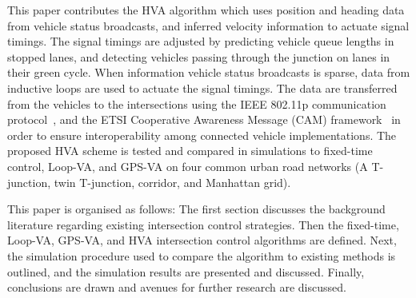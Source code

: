 \documentclass[numbered]{trbunofficial}
\begin{document}
This paper contributes the HVA algorithm which uses position and heading data from vehicle status broadcasts, and inferred velocity information to actuate signal timings. The signal timings are adjusted by predicting vehicle queue lengths in stopped lanes, and detecting vehicles passing through the junction on lanes in their green cycle. When information vehicle status broadcasts is sparse, data from inductive loops are used to actuate the signal timings. The data are transferred from the vehicles to the intersections using the IEEE 802.11p communication protocol~\cite{ieee80211p}, and the ETSI Cooperative Awareness Message (CAM) framework~\cite{EtsiCAM2011} in order to ensure interoperability among connected vehicle implementations. The proposed HVA scheme is tested and compared in simulations to fixed-time control, Loop-VA, and GPS-VA on four common urban road networks (A T-junction, twin T-junction, corridor, and Manhattan grid). %

This paper is organised as follows: The first section discusses the background literature regarding existing intersection control strategies. Then the fixed-time, Loop-VA, GPS-VA, and HVA intersection control algorithms are defined. Next, the simulation procedure used to compare the algorithm to existing methods is outlined, and the simulation results are presented and discussed. Finally, conclusions are drawn and avenues for further research are discussed.
\end{document}
